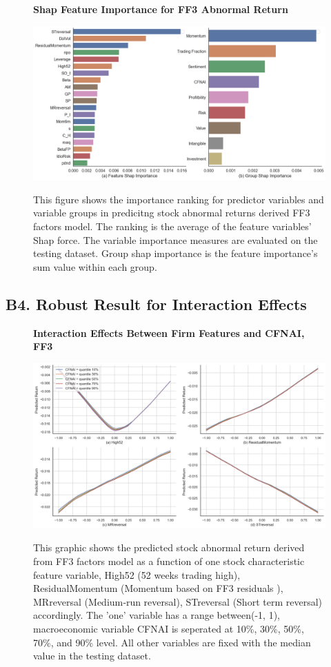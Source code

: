 \begin{figure}[H]
  \centering
  \caption{\textbf{Shap Feature Importance for FF3 Abnormal Return}}
  \includegraphics[width=.8\textwidth]{images/shap_feature_importance_ff3.png}
  \label{fig: feature importance ff3}
  \caption*{\footnotesize{This figure shows the importance ranking for predictor variables and variable groups in predicitng stock abnormal returns derived FF3 factors model. The ranking is the average of the feature variables' Shap force. The variable importance measures are evaluated on the testing dataset. Group shap importance is the feature importance's sum value within each group.}}
\end{figure}

\subsection*{B4. Robust Result for Interaction Effects}
\label{sec:appendixb4}

\begin{figure}[H]
  \centering
  \caption{\textbf{Interaction Effects Between Firm Features and CFNAI, FF3}}
  \includegraphics[width=.8\textwidth]{images/interactive_effect_ff3.png}
  \label{fig: interaction effect_ff3}
  \caption*{\footnotesize{This graphic shows the predicted stock abnormal return derived from FF3 factors model as a function of one stock characteristic feature variable, High52 (52 weeks trading high), ResidualMomentum (Momentum based on FF3 residuals  ), MRreversal (Medium‐run reversal), STreversal (Short term reversal) accordingly. The 'one' variable has a range between(-1, 1), macroeconomic variable CFNAI is seperated at 10\%, 30\%, 50\%, 70\%, and 90\% level. All other variables are fixed with the median value in the testing dataset.}}
\end{figure}

